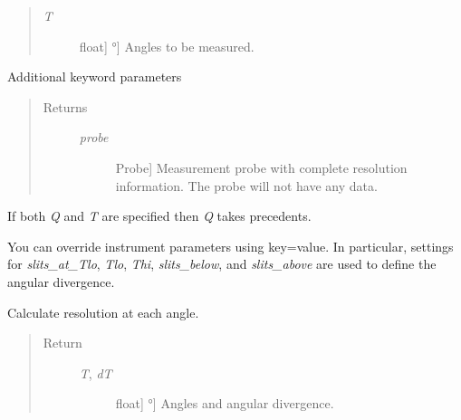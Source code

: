 \documentclass[letterpaper,10pt,english]{sphinxmanual}
\begin{document}
\begin{fulllineitems}
\begin{fulllineitems}
\begin{quote}
\begin{description}
\begin{description}
\item[{\emph{T}}] \leavevmode{[}{[}float{]} \textbar{} °{]}
Angles to be measured.

\end{description}

\end{description}\end{quote}

Additional keyword parameters
\begin{quote}\begin{description}
\item[{Returns }] \leavevmode\begin{description}
\item[{\emph{probe}}] \leavevmode{[}Probe{]}
Measurement probe with complete resolution information.  The
probe will not have any data.

\end{description}

\end{description}\end{quote}

If both \emph{Q} and \emph{T} are specified then \emph{Q} takes precedents.

You can override instrument parameters using key=value.  In
particular, settings for \emph{slits\_at\_Tlo}, \emph{Tlo}, \emph{Thi},
\emph{slits\_below}, and \emph{slits\_above} are used to define the
angular divergence.

\end{fulllineitems}


\begin{fulllineitems}
\label{api/ncnrdata:refl1d.ncnrdata.XRay.readfile}
\end{fulllineitems}


\begin{fulllineitems}
\label{api/ncnrdata:refl1d.ncnrdata.XRay.resolution}
Calculate resolution at each angle.
\begin{quote}\begin{description}
\item[{Return }] \leavevmode\begin{description}
\item[{\emph{T}, \emph{dT}}] \leavevmode{[}{[}float{]} \textbar{} °{]}
Angles and angular divergence.


\end{description}
\end{description}
\end{quote}
\end{fulllineitems}
\end{fulllineitems}
\end{document}
